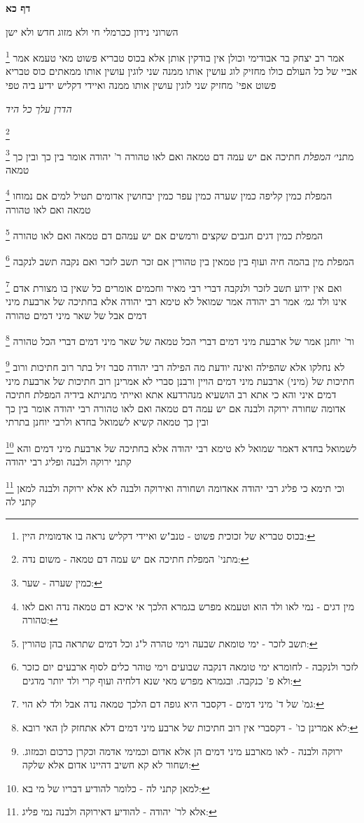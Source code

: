 \documentclass[12pt, openany]{book}
\newcommand{\sethebfont}{
\fontsize{10.5pt}{21.0pt} \selectfont
}
\newcommand{\twocol}[1]{
	{\sethebfont \begin{multicols}{2}
			#1
	\end{multicols}}	
}
\newcommand{\sectname}{}
\newcommand{\newsection}[1]{
	\renewcommand{\sectname}{#1}	
	\vspace{-\baselineskip}
	\begin{center}
		\textbf{%
\fontsize{16pt}{16pt}\selectfont
			#1}
	\end{center}
	\vspace{-\baselineskip}
	\nopagebreak
}
\newcommand{\footnotecomment}[1]{
	\renewcommand\thefootnote{}
	\footnote{#1}}
\newcommand{\commenta}[1]{\footnotecomment{#1}}
\begin{document}
\newsection{דף כא}
\twocol{השרוני נידון ככרמלי חי ולא מזוג חדש ולא ישן 
\commenta{בכוס טבריא של זכוכית פשוט - טנב"ש ואיידי דקליש נראה בו אדמומית היין:}
אמר רב יצחק בר אבודימי וכולן אין בודקין אותן אלא בכוס טבריא פשוט מאי טעמא אמר אביי של כל העולם כולו מחזיק לוג עושין אותו ממנה שני לוגין עושין אותו ממאתים כוס טבריא פשוט אפי' מחזיק שני לוגין עושין אותו ממנה ואיידי דקליש ידיע ביה טפי
\par \par {\large\emph{הדרן עלך כל היד}}\par \par 
\commenta{מתני' המפלת חתיכה אם יש עמה דם טמאה - משום נדה:}

\commenta{כמין שערה - שער:}
מתני׳ {\large\emph{המפלת}} חתיכה אם יש עמה דם טמאה ואם לאו טהורה ר' יהודה אומר בין כך ובין כך טמאה 
\commenta{מין דגים - נמי לאו ולד הוא וטעמא מפרש בגמרא הלכך אי איכא דם טמאה נדה ואם לאו טהורה:}
המפלת כמין קליפה כמין שערה כמין עפר כמין יבחושין אדומים תטיל למים אם נמוחו טמאה ואם לאו טהורה 
\commenta{תשב לזכר - ימי טומאת שבעה וימי טהרה ל"ג וכל דמים שתראה בהן טהורין:}
המפלת כמין דגים חגבים שקצים ורמשים אם יש עמהם דם טמאה ואם לאו טהורה 
\commenta{לזכר ולנקבה - לחומרא ימי טומאה דנקבה שבועים וימי טוהר כלים לסוף ארבעים יום כזכר ולא פ' כנקבה. ובגמרא מפרש מאי שנא דלחיה ועוף קרי ולד יותר מדגים:}
המפלת מין בהמה חיה ועוף בין טמאין בין טהורין אם זכר תשב לזכר ואם נקבה תשב לנקבה
\commenta{גמ' של ד' מיני דמים - דקסבר היא גופה דם הלכך טמאה נדה אבל ולד לא הוי:}
ואם אין ידוע תשב לזכר ולנקבה דברי רבי מאיר וחכמים אומרים כל שאין בו מצורת אדם אינו ולד
{\large\emph{גמ׳}} אמר רב יהודה אמר שמואל לא טימא רבי יהודה אלא בחתיכה של ארבעת מיני דמים אבל של שאר מיני דמים טהורה 
\commenta{לא אמרינן כו' - דקסברי אין רוב חתיכות של ארבע מיני דמים דלא אתחזק לן האי רובא:}
ור' יוחנן אמר של ארבעת מיני דמים דברי הכל טמאה של שאר מיני דמים דברי הכל טהורה 
\commenta{ירוקה ולבנה - לאו מארבע מיני דמים הן אלא אדום וכמימי אדמה וכקרן כרכום וכמזוג. ושחור לא קא חשיב דהיינו אדום אלא שלקה:}
לא נחלקו אלא שהפילה ואינה יודעת מה הפילה רבי יהודה סבר זיל בתר רוב חתיכות ורוב חתיכות של (מיני) ארבעת מיני דמים הויין ורבנן סברי לא אמרינן רוב חתיכות של ארבעת מיני דמים 
איני והא כי אתא רב הושעיא מנהרדעא אתא ואייתי מתניתא בידיה המפלת חתיכה אדומה שחורה ירוקה ולבנה אם יש עמה דם טמאה ואם לאו טהורה רבי יהודה אומר בין כך ובין כך טמאה קשיא לשמואל בחדא ולרבי יוחנן בתרתי 
\commenta{למאן קתני לה - כלומר להודיע דבריו של מי בא:}
לשמואל בחדא דאמר שמואל לא טימא רבי יהודה אלא בחתיכה של ארבעת מיני דמים והא קתני ירוקה ולבנה ופליג רבי יהודה 
\commenta{אלא לר' יהודה - להודיע דאירוקה ולבנה נמי פליג:}
וכי תימא כי פליג רבי יהודה אאדומה ושחורה ואירוקה ולבנה לא אלא ירוקה ולבנה למאן קתני לה 
}
\end{document}
